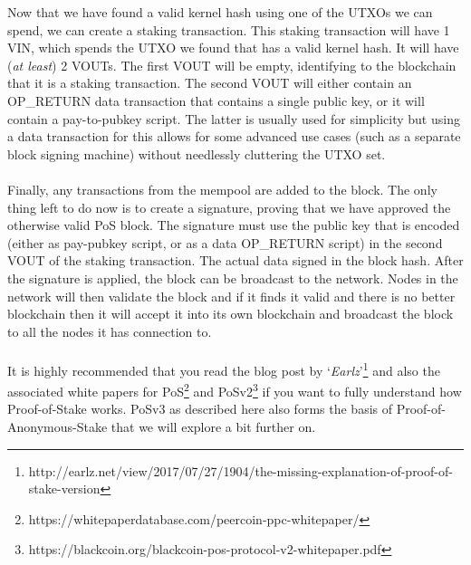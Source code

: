 

\vspace{5mm} %

\newpage
\noindent
Now that we have found a valid kernel hash using one of the UTXOs we can
spend, we can create a staking transaction. This staking transaction will
have 1 VIN, which spends the UTXO we found that has a valid kernel hash.
It will have (\textit{at least}) 2 VOUTs. The first VOUT will be empty,
identifying to the blockchain that it is a staking transaction. The second
VOUT will either contain an OP\_RETURN data transaction that contains a single
public key, or it will contain a pay-to-pubkey script. The latter is usually
used for simplicity but using a data transaction for this allows for some
advanced use cases (such as a separate block signing machine) without
needlessly cluttering the UTXO set.
\\
\\
\noindent
Finally, any transactions from the mempool are added to the block. The only
thing left to do now is to create a signature, proving that we have approved
the otherwise valid PoS block. The signature must use the public key that is
encoded (either as pay-pubkey script, or as a data OP\_RETURN script) in the
second VOUT of the staking transaction. The actual data signed in the block
hash. After the signature is applied, the block can be broadcast to the
network. Nodes in the network will then validate the block and if it finds
it valid and there is no better blockchain then it will accept it into its
own blockchain and broadcast the block to all the nodes it has connection to.
\\
\\
\noindent
It is highly recommended that you read the blog post by
‘\textit{Earlz}’\footnote{http://earlz.net/view/2017/07/27/1904/the-missing-explanation-of-proof-of-stake-version}
and also the associated white papers for
PoS\footnote{https://whitepaperdatabase.com/peercoin-ppc-whitepaper/} and
PoSv2\footnote{https://blackcoin.org/blackcoin-pos-protocol-v2-whitepaper.pdf}
if you want to fully understand how Proof-of-Stake works. PoSv3 as described
here also forms the basis of Proof-of-Anonymous-Stake that we will explore a
bit further on.
